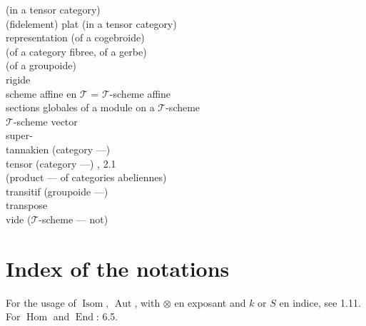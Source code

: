\documentclass[12pt,a4paper]{article}
\theoremstyle{plain}
\theoremstyle{definition}
\DeclareMathOperator{\Hom}{Hom}
\DeclareMathOperator{\End}{End}
\DeclareMathOperator{\Aut}{Aut}
\DeclareMathOperator{\Isom}{Isom}
\begin{document}
\begin{tabbing}
\> (in a tensor category)  \\
(fidelement) plat (in a tensor category) \>  \\
representation (of a cogebroide) \>  \\
\> (of a category fibree, of a gerbe)  \\
\> (of a groupoide)  \\
rigide \>  \\
scheme affine en $\mathcal{T}$ = $\mathcal{T}$-scheme affine \>  \\[4pt]
sections globales of a module on a $\mathcal{T}$-scheme \>  \\
$\mathcal{T}$-scheme vector \>  \\
super- \>  \\
tannakien (category ---) \>  \\
tensor (category ---) \> , 2.1 \\
\> (product --- of categories abeliennes)  \\
transitif (groupoide ---) \>  \\
transpose \>  \\
vide ($\mathcal{T}$-scheme --- not) \> 
\end{tabbing}

\section*{Index of the notations}

For the usage of $\Isom$, $\Aut$, with $\otimes$ en exposant and $k$ or $S$ en indice, see 1.11. For $\Hom$ and $\End$: 6.5.
\end{document}
